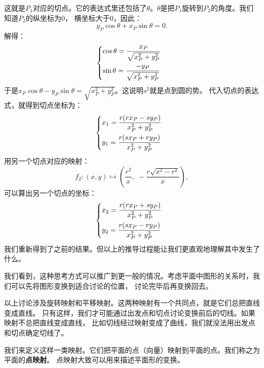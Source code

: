 \documentclass[12pt,UTF8]{ctexbook}
\begin{document}
这就是$P_1$对应的切点。它的表达式里还包括了$\theta$。$\theta$是把$P_1$旋转到$P_2$的角度。我们知道$P_2$的纵坐标为$0$，
横坐标大于$0$，因此：
$$ y_P \cos{\theta} + x_P\sin{\theta} = 0. $$
解得：
\begin{alignat*}{1}
&   \begin{dcases}
        \cos{\theta} = \frac{x_P}{\sqrt{x_P^2 + y_P^2}} \\
        \sin{\theta} = \frac{-y_P}{\sqrt{x_P^2 + y_P^2}} 
    \end{dcases}
\end{alignat*}
于是$x_P\cos{\theta} - y_P\sin{\theta} = \sqrt{x_P^2 + y_P^2}$。这说明$s^2$就是点到圆的势。
代入切点的表达式，就得到切点坐标为：
\begin{alignat*}{1}
    &   \begin{dcases}
    x_1 = \frac{r(rx_P - sy_P) }{x_P^2+y_P^2} \\
    y_1 = \frac{r(sx_P + ry_P)}{x_P^2+y_P^2}
\end{dcases}
\end{alignat*}
用另一个切点对应的映射：
$$f_2: (x, y) \mapsto \left(\frac{r^2}{x},\,\, -\frac{r\sqrt{x^2 - r^2}}{x}\right),$$
可以算出另一个切点的坐标：
\begin{alignat*}{1}
    &   \begin{dcases}
        x_2 = \frac{r(rx_P + sy_P) }{x_P^2+y_P^2} \\
        y_2 = \frac{r(sx_P - ry_P)}{x_P^2+y_P^2}
    \end{dcases}
\end{alignat*}
我们重新得到了之前的结果。但以上的推导过程能让我们更直观地理解其中发生了什么。

我们看到，这种思考方式可以推广到更一般的情况。考虑平面中图形的关系时，我们可以先将图形变换到适合讨论的位置，
讨论完毕后再变换回去。

以上讨论涉及旋转映射和平移映射。这两种映射有一个共同点，就是它们总把直线变成直线。
只有这样，我们才可能通过出发点和切点讨论变换前后的切线。如果映射不总把直线变成直线，
比如切线经过映射变成了曲线，我们就没法用出发点和切点确定切线了。

我们来定义这样一类映射。它们把平面的点（向量）映射到平面的点。我们称之为平面的\textbf{点映射}。
点映射大致可以用来描述平面形的变换。
\end{document}
